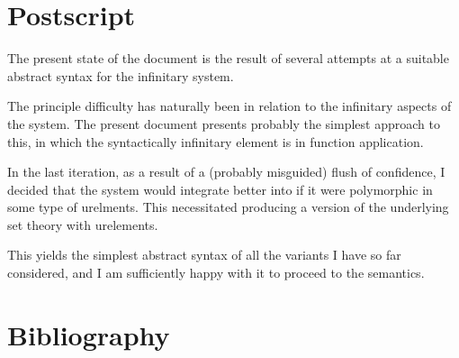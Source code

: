 
\section{Postscript}\label{POSTSCRIPT}

The present state of the document is the result of several attempts at a suitable abstract syntax for the infinitary system.

The principle difficulty has naturally been in relation to the infinitary aspects of the system.
The present document presents probably the simplest approach to this, in which the syntactically infinitary element is in function application.

In the last iteration, as a result of a (probably misguided) flush of confidence, I decided that the system would integrate better into {\Product} if it were polymorphic in some type of urelments.
This necessitated producing a version of the underlying set theory with urelements.

This yields the simplest abstract syntax of all the variants I have so far considered, and I am sufficiently happy with it to proceed to the semantics.

\appendix

\vfill



\pagebreak

\section*{Bibliography}\label{BIBLIOGRAPHY}

{\def\section*#1{\ignore{#1}}
\raggedright


} %

{
{\small\printindex}}


